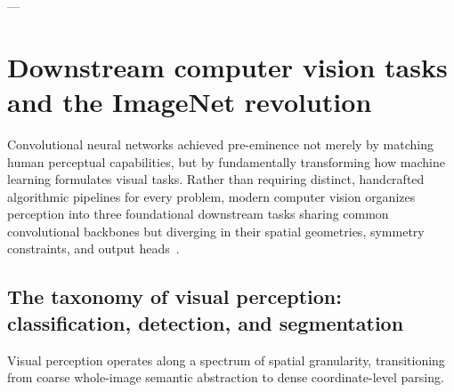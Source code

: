 ---

\section[Downstream computer vision tasks and ImageNet]{Downstream computer vision tasks and the ImageNet revolution}
\label{sec:downstream_cv_tasks_imagenet}

Convolutional neural networks achieved pre-eminence not merely by matching human perceptual capabilities, but by fundamentally transforming how machine learning formulates visual tasks. Rather than requiring distinct, handcrafted algorithmic pipelines for every problem, modern computer vision organizes perception into three foundational downstream tasks sharing common convolutional backbones but diverging in their spatial geometries, symmetry constraints, and output heads~\cite{prince2023understanding,bishop2024deep}.

\subsection{The taxonomy of visual perception: classification, detection, and segmentation}
\label{sec:cv_tasks_taxonomy}

Visual perception operates along a spectrum of spatial granularity, transitioning from coarse whole-image semantic abstraction to dense coordinate-level parsing.

